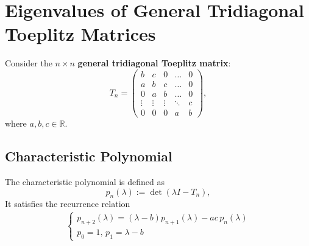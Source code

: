 \documentclass[11pt]{article}
\begin{document}
\section{Eigenvalues of General Tridiagonal Toeplitz Matrices}
Consider the $n\times n$ \textbf{general tridiagonal Toeplitz matrix}:
\[
    T_n =
    \begin{pmatrix}
    b & c & 0 & \dots & 0\\
    a & b & c & \dots & 0\\
    0 & a & b & \dots & 0\\
    \vdots & \vdots & \vdots & \ddots & c\\
    0 & 0 & 0 & a & b
    \end{pmatrix},
\]
where $a, b, c \in \mathbb{R}$.\\
\subsection{Characteristic Polynomial}
The characteristic polynomial is defined as
\[
p_n(\lambda) := \det(\lambda I - T_n),
\]
It satisfies the recurrence relation
\begin{align*}
    \begin{cases}
        p_{n+2}(\lambda) = (\lambda - b)p_{n+1}(\lambda) - ac \, p_n(\lambda)\\
        p_0 = 1, \,p_1 = \lambda -b
    \end{cases}
\end{align*}
\end{document}
